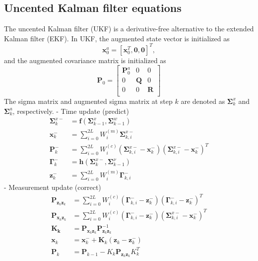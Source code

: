 \documentclass[12pt]{article}
\begin{document}
\subsection{Uncented Kalman filter equations}

The uncented Kalman filter (UKF) is a derivative-free alternative to the extended Kalman filter (EKF). In UKF, the augmented state vector is initialized as
%
\begin{equation}
	\mathbf{x}^a_0 = [\mathbf{x}^T_0, \mathbf{0}, \mathbf{0}]^T, 
\end{equation}
%
and the augmented covariance matrix is initialized as
%
\begin{equation} \label{eq:UK_aug}
	\mathbf{P}_0 = \begin{bmatrix}
	\mathbf{P}^a_0 & 0 & 0 \\
	0 & \mathbf{Q} & 0 \\
	0 & 0 & \mathbf{R} \\ 
	\end{bmatrix}
\end{equation}
%
The sigma matrix and augmented sigma matrix at step $k$ are denoted as \(\mathbf{\Sigma}_k^x\) and \(\mathbf{\Sigma}_k^a\), respectively.
%
- Time update (predict)
%
\begin{align}
	\mathbf{\Sigma}_k^{x-} &= \mathbf{f}( \mathbf{\Sigma}^x_{k-1}, \mathbf{\Sigma}^w_{k-1}) \label{eq:UK_pre1} \\
	\mathbf{x}_k^{-} &= \sum_{i=0}^{2L}{W_i^{(m)}\mathbf{\Sigma}^{x-}_{k,i}} 	\\		
	\mathbf{P}_{k}^{-} &= \sum_{i=0}^{2L}{W_i^{(c)}(\mathbf{\Sigma}^{x-}_{k,i} - 		\mathbf{x}_k^{-})(\mathbf{\Sigma}^{x-}_{k,i} - \mathbf{x}_k^{-})^T} \label{eq:UK_pre3} \\
	\mathbf{\Gamma}_k^- &= \mathbf{h}(\mathbf{\Sigma}_k^{x-}, \mathbf{\Sigma}^\nu_{k-1}) \label{eq:UK_pre4} \\ 
	\mathbf{z}_k^{-} &= \sum_{i=0}^{2L}{W_i^{(m)}\mathbf{\Gamma}^{-}_{k,i}}
\end{align}
%
- Measurement update (correct)
%
\begin{align}
	\mathbf{P}_{\mathbf{z}_k \mathbf{z}_k} &= \sum_{i=0}^{2L}{W_i^{(c)}(\mathbf{\Gamma}^{-}_{k,i} - \mathbf{z}_k^{-})(\mathbf{\Gamma}^{-}_{k,i} - \mathbf{z}_k^{-})^T} \label{eq:UK_cor1} \\
	\mathbf{P}_{\mathbf{x}_k \mathbf{z}_k} &= \sum_{i=0}^{2L}{W_i^{(c)}(\mathbf{\Gamma}^{-}_{k,i} - 		\mathbf{z}_k^{-})(\mathbf{\Sigma}^{x-}_{k,i} - \mathbf{x}_k^{-})^T} \\
	\mathbf{K_k} &= \mathbf{P}_{\mathbf{x}_k \mathbf{z}_k}\mathbf{P}_{\mathbf{z}_k \mathbf{z}_k}^{-1} \\
	\mathbf{x}_{k} &= \mathbf{x}_{k}^{-} + \mathbf{K}_{k}( \mathbf{z}_k - \mathbf{z}^-_k) \\
	\mathbf{P}_k &= \mathbf{P}_{k-1} - K_k\mathbf{P}_{\mathbf{z}_k \mathbf{z}_k}K_k^T
\end{align}
\end{document}
